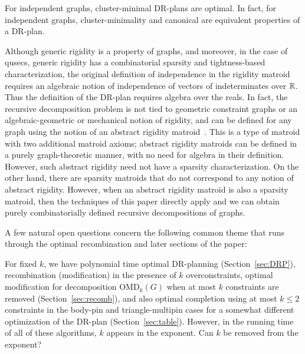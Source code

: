 \begin{conjecture}
\label{conj:mfaisoptimal:rephrase}
For independent graphs, cluster-minimal DR-plans are optimal. In fact, for independent graphs, cluster-minimality and canonical are equivalent properties of a DR-plan.
\end{conjecture}


\begin{openproblem}
\label{open:sparsitymatroid}
Although generic rigidity is a property of graphs, and moreover,  in the case of qusecs, generic rigidity has a combinatorial sparsity and tightness-based characterization, the original definition of independence in the rigidity matroid requires an algebraic notion of independence of vectors of indeterminates over $\mathbb{R}$. Thus the definition of the DR-plan requires algebra over the reals.
In fact, the recursive decomposition problem is not tied to geometric constraint graphs or an algebraic-geometric or mechanical notion of rigidity, and can be defined for any graph using the notion of an abstract rigidity matroid~\cite{graver93book}. This is a type of matroid with two additional matroid axioms; abstract rigidity matroids can be defined in a purely graph-theoretic manner,  with no need for algebra in their definition. However, such abstract rigidity need not have a sparsity characterization. On the other hand, there are sparsity matroids that do not correspond to any notion of abstract rigidity.
However, when an abstract rigidity matroid is also a sparsity matroid, then the techniques of this paper directly apply and we can obtain purely combinatorially defined recursive decompositions of graphs.
\end{openproblem}


A few natural  open questions concern the following common theme that runs through the optimal recombination and later sections of the paper:

\begin{openproblem}
    For fixed $k$, we have
    polynomial time optimal DR-planning (Section~\ref{sec:DRP}),
    recombination (modification) in the presence of $k$ overconstraints,
    optimal modification for decomposition OMD$_k(G)$ when at most $k$ constraints are removed (Section~\ref{sec:recomb}),
    and also optimal completion using at most $k\le 2$ constraints in the body-pin and triangle-multipin cases for a somewhat different optimization of the DR-plan (Section~\ref{sec:table}).
    However, in the running time of all of these algorithms, $k$ appears in the exponent. Can $k$ be removed from the exponent?
\end{openproblem}

